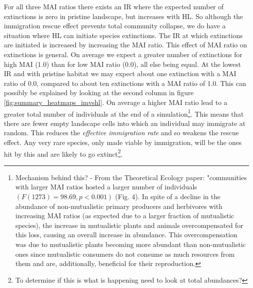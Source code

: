 \begin{itemize}
For all three MAI ratios there exists an IR where the expected number of extinctions is zero in pristine landscape, but increases with HL. So although the immigration rescue effect prevents total community collapse, we do have a situation where HL can initiate species extinctions. The IR at which extinctions are initiated is increased by increasing the MAI ratio. This effect of MAI ratio on extinctions is general. On average we expect a greater number of extinctions for high MAI (1.0) than for low MAI ratio (0.0), all else being equal. At the lowest IR and with pristine habitat we may expect about one extinction with a MAI ratio of 0.0, compared to about ten extinctions with a MAI ratio of 1.0. This can possibly be explained by looking at the second column in figure \ref{fig:summary_heatmaps_imvshl}. On average a higher MAI ratio lead to a greater total number of individuals at the end of a simulation\footnote{Mechanism behind this? - From the Theoretical Ecology paper: "communities with larger MAI ratios hosted a larger number of individuals $(F(1273) = 98.69, p < 0.001)$ (Fig. 4). In spite of a decline in the abundance of non-mutualistic primary producers and herbivores with increasing MAI ratios (as expected due to a larger fraction of mutualistic species), the increase in mutualistic plants and animals overcompensated for this loss, causing an overall increase in abundance. This overcompensation was due to mutualistic plants becoming more abundant than non-mutualistic ones since mutualistic consumers do not consume as much resources from them and are, additionally, beneficial for their reproduction.}. This means that there are fewer empty landscape cells into which an individual may immigrate at random. This reduces the \emph{effective immigration rate} and so weakens the rescue effect. Any very rare species, only made viable by immigration, will be the ones hit by this and are likely to go extinct\footnote{To determine if this is what is happening need to look at total abundances?}. 


\end{itemize}

